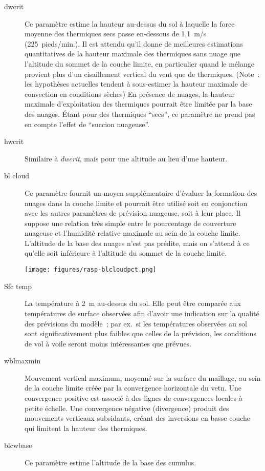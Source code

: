 \begin{description}
\item[dwcrit]
Ce paramètre estime la hauteur au-dessus du sol à laquelle la force moyenne des thermiques secs passe en-dessous de 1,1~m/s (225~pieds/min.).
Il est attendu qu'il donne de meilleures estimations quantitatives de la hauteur maximale des thermiques sans nuage que l'altitude du sommet de la couche limite, en particulier quand le mélange provient plus d'un cisaillement vertical du vent que de thermiques.
(Note~: les hypothèses actuelles tendent à sous-estimer la hauteur maximale de convection en conditions sèches)
En présence de nuages, la hauteur maximale d'exploitation des thermiques pourrait être limitée par la base des nuages.
Étant pour des thermiques ``secs'', ce paramètre ne prend pas en compte l'effet de ``succion nuageuse''.

\item[hwcrit]  
Similaire à \emph{dwcrit}, mais pour une altitude au lieu d'une hauteur.

\item[bl cloud]
Ce paramètre fournit un moyen supplémentaire d'évaluer la formation des nuages dans la couche limite et pourrait être utilisé soit en conjonction avec les autres paramètres de prévision nuageuse, soit à leur place.
Il suppose une relation très simple entre le pourcentage de couverture nuageuse et l'humidité relative maximale au sein de la couche limite.
L'altitude de la base des nuages n'est pas prédite, mais on s'attend à ce qu'elle soit inférieure à l'altitude du sommet de la couche limite.

\begin{center}
\texttt{[image: figures/rasp-blcloudpct.png]}
\end{center}

\item[Sfc temp] 
La température à 2~m au-dessus du sol.
Elle peut être comparée aux températures de surface observées afin d'avoir une indication sur la qualité des prévisions du modèle~; par ex.\ si les températures observées au sol sont significativement plus faibles que celles de la prévision, les conditions de vol à voile seront moins intéressantes que prévues.
\item[wblmaxmin]
Mouvement vertical maximum, moyenné sur la surface du maillage, au sein de la couche limite créée par la convergence horizontale du vetn.
Une convergence positive est associé à des lignes de convergences locales à petite échelle.
Une convergence négative (divergence) produit des mouvements verticaux subsidants, créant des inversions en basse couche qui limitent la hauteur des thermiques.
\item[blcwbase]
Ce paramètre estime l'altitude de la base des cumulus.
\end{description}

